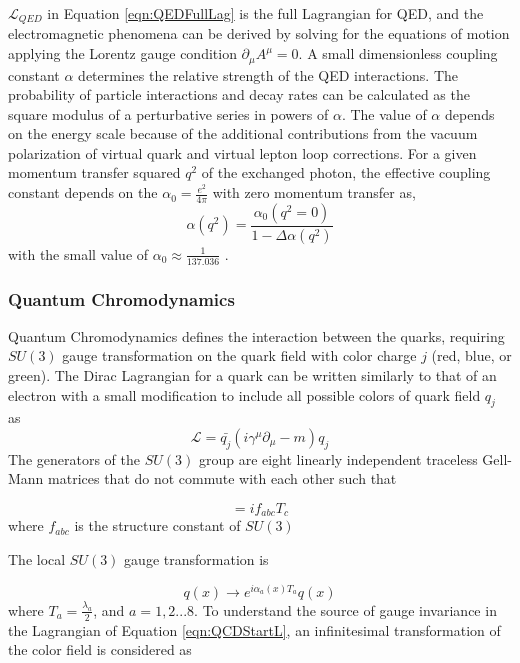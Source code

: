 $\mathcal{L}_{QED}$ in Equation \ref{eqn:QEDFullLag} is the full Lagrangian for QED, and the electromagnetic phenomena can be derived by solving for the equations of motion applying the Lorentz gauge condition $\partial_{\mu}A^{\mu}=0$. A small dimensionless coupling constant $\alpha$ determines the relative strength of the QED interactions. The probability of particle interactions and decay rates can be calculated as the square modulus of a perturbative series in powers of $\alpha$. The value of $\alpha$ depends on the energy scale because of the additional contributions from the vacuum polarization of virtual quark and virtual lepton loop corrections. For a given momentum transfer squared $q^2$ of the exchanged photon, the effective coupling constant depends on the $\alpha_{0} = \frac{e^2}{4\pi}$ with zero momentum transfer as, 
\begin{equation}
    \alpha(q^2) = \frac{\alpha_{0} (q^2=0)}{1-\Delta \alpha(q^2)}
\end{equation}
with the small value of $\alpha_{0} \approx \frac{1}{137.036}$ \cite{AlphaQED}.

\subsubsection{Quantum Chromodynamics }
\label{subsubsec:QCD}

Quantum Chromodynamics defines the interaction between the quarks, requiring $SU(3)$ gauge transformation on the quark field with color charge $j$ (red, blue, or green). The Dirac Lagrangian for a quark can be written similarly to that of an electron with a small modification to include all possible colors of quark field $q_{j}$ as
\begin{equation}
\mathcal{L} = \bar{q_{j}}(i\gamma^{\mu}\partial_{\mu} - m )q_{j}
\label{eqn:QCDStartL}
\end{equation}
The generators of the $SU(3)$ group are eight linearly independent traceless Gell-Mann matrices that do not commute with each other such that 

\begin{equation}
[ T_{a},T_{b} ] = if_{abc}T_{c}
\label{eqn:SU3GellManMat}
\end{equation}
where $f_{abc}$ is the structure constant of $SU(3)$

The local $SU(3)$ gauge transformation is 

\begin{equation}
q(x) \rightarrow e^{i \alpha_a(x) T_{a}} q(x)
\label{eqn:QCDSU3LT}
\end{equation}
where $T_{a} = \frac{\lambda_{a}}{2}$, and $a = {1,2...8}$. To understand the source of gauge invariance in the Lagrangian of Equation \ref{eqn:QCDStartL}, an infinitesimal transformation of the color field is considered as

